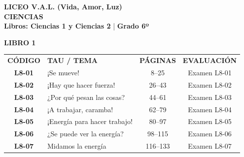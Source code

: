\documentclass[12pt, letterpaper]{article}
\begin{document}
 
	
	\begin{center} 
		{\huge \textbf{\color{valblue} LICEO V.A.L. (Vida, Amor, Luz)}}\\[0.2cm] 
		{\Large \textbf{CIENCIAS}}\\[0.2cm] 
		{\large \quad \textbf{Libros: Ciencias 1 y Ciencias 2} \quad | \quad \textbf{Grado 6º}} 
	\end{center} 
	\vspace{0.4cm} 
	
	\renewcommand{\arraystretch}{1.5}
	
	\noindent \textbf{\Large \color{valblue} LIBRO 1} 
	\vspace{0.2cm} 
	\begin{center} 
		\large 
		\begin{tabularx}{\textwidth}{cXcc} 
			\textbf{CÓDIGO} & \textbf{TAU / TEMA} & \textbf{PÁGINAS} & \textbf{EVALUACIÓN} \\ 
			\textbf{L8-01} & ¡Se mueve! &  8--25 & Examen L8-01 \\ 
			\rowcolor{valgray} \textbf{L8-02} & ¡Hay que hacer fuerza! &  26--43 & Examen L8-02 \\ 
			\textbf{L8-03} & ¿Por qué pesan las cosas? &  44--61 & Examen L8-03 \\ 
			\rowcolor{valgray} \textbf{L8-04} & ¡A trabajar, caramba! &  62--79 & Examen L8-04 \\ 
			\textbf{L8-05} & ¡Energía para hacer trabajo! &  80--97 & Examen L8-05 \\ 
			\rowcolor{valgray} \textbf{L8-06} & ¿Se puede ver la energía? &  98--115 & Examen L8-06 \\ 
			\textbf{L8-07} & Midamos la energía &  116--133 & Examen L8-07 \\ 
		\end{tabularx} 
	\end{center} 
	\vspace{0.6cm} 
	
\end{document}
